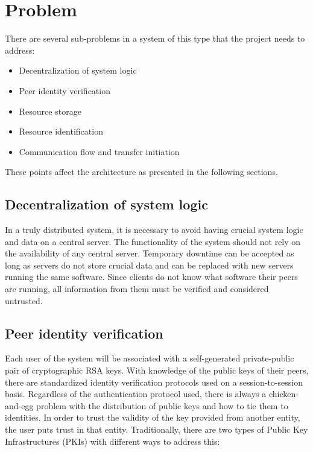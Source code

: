 \section{Problem}
\label{sec:problem}

There are several sub-problems in a system of this type that the project needs to address:

\begin{itemize}
\item Decentralization of system logic
\item Peer identity verification
\item Resource storage
\item Resource identification
\item Communication flow and transfer initiation
\end{itemize}

These points affect the architecture as presented in the following sections.

\subsection{Decentralization of system logic}
In a truly distributed system, it is necessary to avoid having crucial system logic and data on a central server. The functionality of the system should not rely on the availability of any central server. Temporary downtime can be accepted as long as servers do not store crucial data and can be replaced with new servers running the same software. Since clients do not know what software their peers are running, all information from them must be verified and considered untrusted.

\subsection{Peer identity verification}
Each user of the system will be associated with a self-generated private-public pair of cryptographic RSA keys. With knowledge of the public keys of their peers, there are standardized identity verification protocols used on a session-to-session basis. Regardless of the authentication protocol used, there is always a chicken-and-egg problem with the distribution of public keys and how to tie them to identities. In order to trust the validity of the key provided from another entity, the user puts trust in that entity. Traditionally, there are two types of Public Key Infrastructures (PKIs) with different ways to address this:

